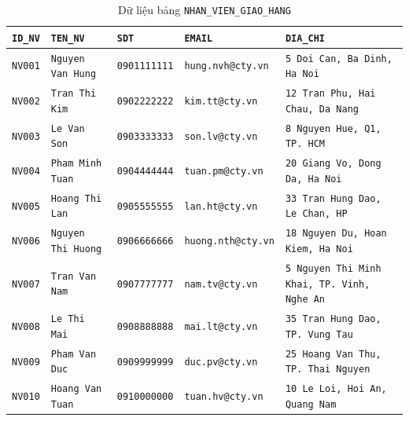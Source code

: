 \documentclass[11pt]{report}
\begin{document}
\begin{table}[H]
    \centering
    \renewcommand{\tabularxcolumn}[1]{m{#1}}
    \begin{tabularx}{\textwidth}{|>{\scriptsize}l|>{\scriptsize}l|>{\scriptsize}l|>{\scriptsize}l|>{\raggedright\arraybackslash\scriptsize}X|} \hline
        \rowcolor{teal!30}
        \textbf{\texttt{ID\_NV}} & \textbf{\texttt{TEN\_NV}} & \textbf{\texttt{SDT}} & \textbf{\texttt{EMAIL}} & \textbf{\texttt{DIA\_CHI}} \\ \hline
        \texttt{NV001} & \texttt{Nguyen Van Hung}  & \texttt{0901111111} & \texttt{hung.nvh@cty.vn}  & \texttt{5 Doi Can, Ba Dinh, Ha Noi} \\ \hline
        \texttt{NV002} & \texttt{Tran Thi Kim}     & \texttt{0902222222} & \texttt{kim.tt@cty.vn}    & \texttt{12 Tran Phu, Hai Chau, Da Nang} \\ \hline
        \texttt{NV003} & \texttt{Le Van Son}       & \texttt{0903333333} & \texttt{son.lv@cty.vn}    & \texttt{8 Nguyen Hue, Q1, TP. HCM} \\ \hline
        \texttt{NV004} & \texttt{Pham Minh Tuan}   & \texttt{0904444444} & \texttt{tuan.pm@cty.vn}   & \texttt{20 Giang Vo, Dong Da, Ha Noi} \\ \hline
        \texttt{NV005} & \texttt{Hoang Thi Lan}    & \texttt{0905555555} & \texttt{lan.ht@cty.vn}    & \texttt{33 Tran Hung Dao, Le Chan, HP} \\ \hline
        \texttt{NV006} & \texttt{Nguyen Thi Huong} & \texttt{0906666666} & \texttt{huong.nth@cty.vn} & \texttt{18 Nguyen Du, Hoan Kiem, Ha Noi} \\ \hline
        \texttt{NV007} & \texttt{Tran Van Nam}     & \texttt{0907777777} & \texttt{nam.tv@cty.vn}    & \texttt{5 Nguyen Thi Minh Khai, TP. Vinh, Nghe An} \\ \hline
        \texttt{NV008} & \texttt{Le Thi Mai}       & \texttt{0908888888} & \texttt{mai.lt@cty.vn}    & \texttt{35 Tran Hung Dao, TP. Vung Tau} \\ \hline
        \texttt{NV009} & \texttt{Pham Van Duc}     & \texttt{0909999999} & \texttt{duc.pv@cty.vn}    & \texttt{25 Hoang Van Thu, TP. Thai Nguyen} \\ \hline
        \texttt{NV010} & \texttt{Hoang Van Tuan}   & \texttt{0910000000} & \texttt{tuan.hv@cty.vn}   & \texttt{10 Le Loi, Hoi An, Quang Nam} \\ \hline
    \end{tabularx}
    \caption{Dữ liệu bảng \texttt{NHAN\_VIEN\_GIAO\_HANG}}
    \label{tab:data_nv}
\end{table}
\end{document}
